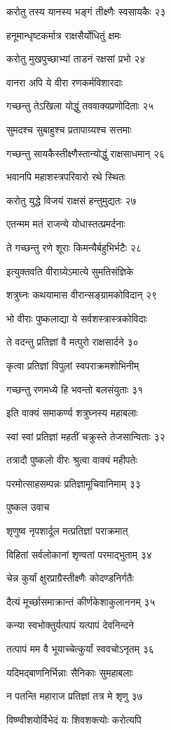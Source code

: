करोतु तस्य यानस्य भङ्गं तीक्ष्णैः स्वसायकैः २३

हनूमान्धृष्टकर्मात्र राक्षसैर्योधितुं क्षमः

करोतु मुखपुच्छाभ्यां ताडनं रक्षसां प्रभो २४

वानरा अपि ये वीरा रणकर्मविशारदाः

गच्छन्तु तेऽखिला योद्धुं तववाक्यप्रणोदिताः २५

सुमदश्च सुबाहुश्च प्रतापाग्र्यश्च सत्तमाः

गच्छन्तु सायकैस्तीक्ष्णैस्तान्योद्धुं राक्षसाधमान् २६

भवानपि महाशस्त्रपरिवारो रथे स्थितः

करोतु युद्धे विजयं राक्षसं हन्तुमुद्यतः २७

एतन्मम मतं राजन्ये योधास्तत्प्रमर्दनाः

ते गच्छन्तु रणे शूराः किमन्यैर्बहुभिर्भटैः २८

इत्युक्तवति वीराग्र्येऽमात्ये सुमतिसंज्ञिके

शत्रुघ्नः कथयामास वीरान्सङ्ग्रामकोविदान् २९

भो वीराः पुष्कलाद्या ये सर्वशस्त्रास्त्रकोविदाः

ते वदन्तु प्रतिज्ञां वै मत्पुरो राक्षसार्दने ३०

कृत्वा प्रतिज्ञां विपुलां स्वपराक्रमशोभिनीम्

गच्छन्तु रणमध्ये हि भवन्तो बलसंयुताः ३१

इति वाक्यं समाकर्ण्य शत्रुघ्नस्य महाबलाः

स्वां स्वां प्रतिज्ञां महतीं चक्रुस्ते तेजसान्विताः ३२

तत्रादौ पुष्कलो वीरः श्रुत्वा वाक्यं महीपतेः

परमोत्साहसम्पन्नः प्रतिज्ञामूचिवानिमाम् ३३

पुष्कल उवाच

शृणुष्व नृपशार्दूल मत्प्रतिज्ञां पराक्रमात्

विहितां सर्वलोकानां शृण्वतां परमाद्भुताम् ३४

चेन्न कुर्यां क्षुरप्राग्रैस्तीक्ष्णैः कोदण्डनिर्गतैः

दैत्यं मूर्च्छासमाक्रान्तं कीर्णकेशाकुलाननम् ३५

कन्या स्वभोक्तुर्यत्पापं यत्पापं देवनिन्दने

तत्पापं मम वै भूयाच्चेत्कुर्यां स्ववचोऽनृतम् ३६

यदिमद्बाणनिर्भिन्नाः सैनिकाः सुमहाबलाः

न पतन्ति महाराज प्रतिज्ञां तत्र मे शृणु ३७

विष्ण्वीशयोर्विभेदं यः शिवशक्त्योः करोत्यपि

